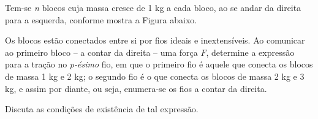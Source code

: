 \begin{exemplo}\label{exemplo_newton_terceiralei03}

Tem-se \textit{n} blocos cuja massa cresce de 1 kg a cada bloco, ao se andar da direita para a esquerda, conforme mostra a Figura abaixo.

\vspace{0.3cm}
\begin{center}
\end{center}
\vspace{0.3cm}


Os blocos estão conectados entre si por fios ideais e inextensíveis. Ao comunicar ao primeiro bloco -- a contar da direita -- uma força $F$, determine a expressão para a tração no \textit{p-ésimo} fio, em que o primeiro fio é aquele que conecta os blocos de massa 1 kg e 2 kg; o segundo fio é o que conecta os blocos de massa 2 kg e 3 kg, e assim por diante, ou seja, enumera-se os fios a contar da direita.

Discuta as condições de existência de tal expressão.

\resolucao


\end{exemplo}
